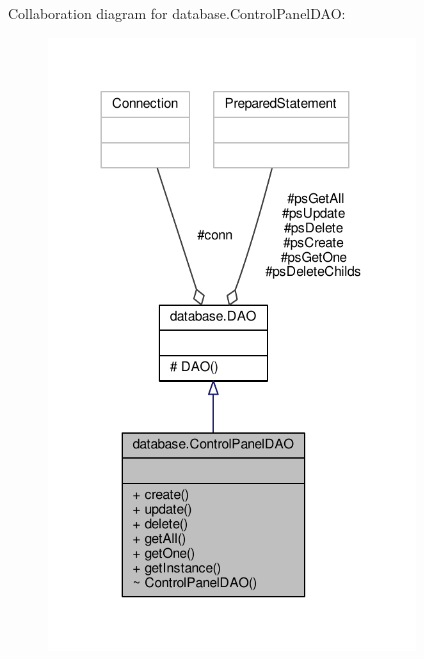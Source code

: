 Collaboration diagram for database.\-Control\-Panel\-D\-A\-O\-:\nopagebreak
\begin{figure}[H]
\begin{center}
\leavevmode
\includegraphics[width=276pt]{classdatabase_1_1ControlPanelDAO__coll__graph}
\end{center}
\end{figure}
